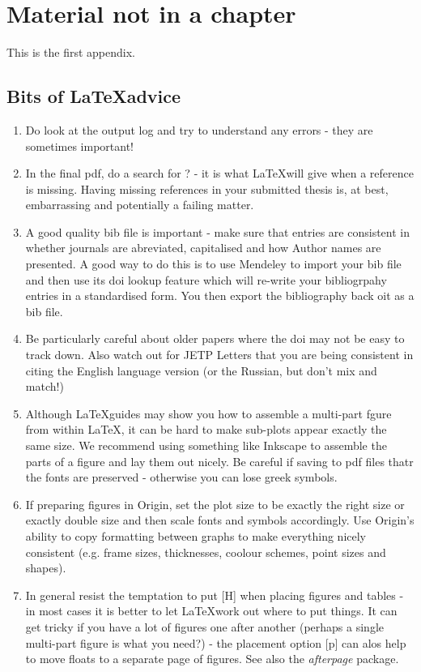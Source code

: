 \chapter{Material not in a chapter}
This is the first appendix.

\section{Bits of \LaTeX advice}

\begin{enumerate}
	\item Do look at the output log and try to understand any errors - they are sometimes important!
	\item In the final pdf, do a search for ? - it is what \LaTeX will give when a reference is missing. Having missing references in your submitted thesis is, at best, embarrassing and potentially a failing matter.
	\item A good quality bib file is important - make sure that entries are consistent in whether journals are abreviated, capitalised and how Author names are presented. A good way to do this is to use Mendeley to import your bib file and then use its doi lookup feature which will re-write your bibliogrpahy entries in a standardised form. You then export the bibliography back oit as a bib file.
	\item Be particularly careful about older papers where the doi may not be easy to track down. Also watch out for JETP Letters that you are being consistent in citing the English language version (or the Russian, but don't mix and match!)
	\item Although \LaTeX guides may show you how to assemble a multi-part fgure from within \LaTeX, it can be hard to make sub-plots appear exactly the same size. We recommend using something like Inkscape to assemble the parts of a figure and lay them out nicely. Be careful if saving to pdf files thatr the fonts are preserved - otherwise you can lose greek symbols.
	\item If preparing figures in Origin, set the plot size to be exactly the right size or exactly double size and then scale fonts and symbols accordingly. Use Origin's ability to copy formatting between graphs to make everything nicely consistent (e.g. frame sizes, thicknesses, coolour schemes, point sizes and shapes).
	\item In general resist the temptation to put [H] when placing figures and tables - in most cases it is better to let \LaTeX work out where to put things. It can get tricky if you have a lot of figures one after another (perhaps a single multi-part figure is what you need?) - the placement option [p] can alos help to move floats to a separate page of figures. See also the \textit{afterpage} package. 
\end{enumerate}